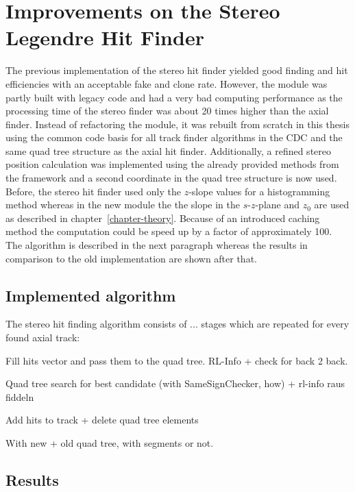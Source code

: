 \section{Improvements on the Stereo Legendre Hit Finder} \label{section-stereo}

The previous implementation of the stereo hit finder yielded good finding and hit efficiencies with an acceptable fake and clone rate. However, the module was partly built with legacy code and had a very bad computing performance as the processing time of the stereo finder was about 20 times higher than the axial finder. Instead of refactoring the module, it was rebuilt from scratch in this thesis using the common code basis for all track finder algorithms in the CDC and the same quad tree structure as the axial hit finder. Additionally, a refined stereo position calculation was implemented using the already provided methods from the framework and a second coordinate in the quad tree structure is now used. Before, the stereo hit finder used only the $z$-slope values for a histogramming method whereas in the new module the the slope in the $s$-$z$-plane and $z_0$ are used as described in chapter~\ref{chapter-theory}. Because of an introduced caching method the computation could be speed up by a factor of approximately 100. The algorithm is described in the next paragraph whereas the results in comparison to the old implementation are shown after that.

\subsection{Implemented algorithm}

The stereo hit finding algorithm consists of ... stages which are repeated for every found axial track:
\begin{zlist}
  \item Fill hits vector and pass them to the quad tree. RL-Info + check for back 2 back.
  \item Quad tree search for best candidate (with SameSignChecker, how) + rl-info raus fiddeln
  \item Add hits to track + delete quad tree elements
\end{zlist}

With new + old quad tree, with segments or not.

\subsection{Results}

